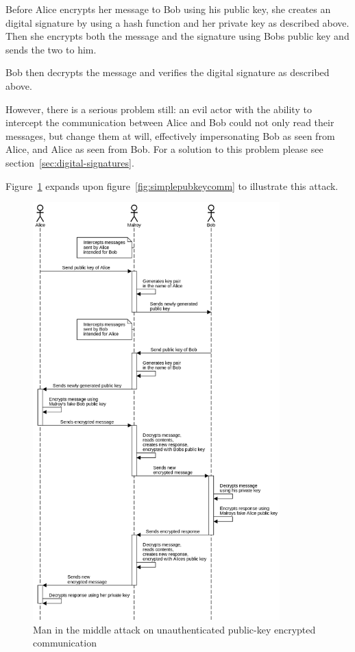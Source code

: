 Before Alice encrypts her message to Bob using his public key,
she creates an digital signature by using a hash function and her private key as described above.
Then she encrypts both the message and the signature using Bobs public key and sends the two to him.

Bob then decrypts the message and verifies the digital signature as described above.

However, there is a serious problem still: an evil actor with the ability to intercept the communication
between Alice and Bob could not only read their messages,
but change them at will, effectively impersonating Bob as seen from Alice,
and Alice as seen from Bob.
For a solution to this problem please see section~\ref{sec:digital-signatures}.

Figure~\ref{fig:pubkeymidm} expands upon figure~\ref{fig:simplepubkeycomm} to illustrate this attack.

\begin{figure}
    \centering
    \includegraphics[width=0.85\textwidth]{images/pubkey_midm.png}
    \caption{Man in the middle attack on unauthenticated public-key encrypted communication}
    \label{fig:pubkeymidm}
\end{figure}



